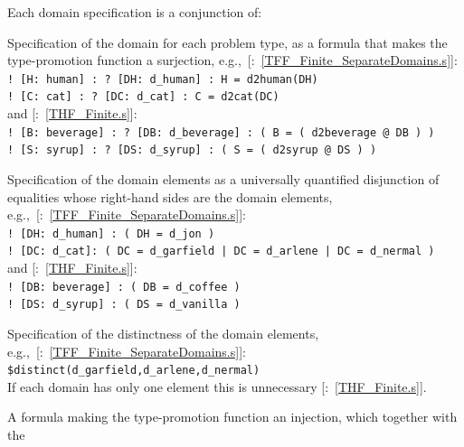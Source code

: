 \documentclass{easychair}
\newcommand{\smalltt}[1]{\small \texttt{#1}}
\newcommand{\example}{{\scriptsize \faFile[regular]}}
\newenvironment{packed_itemize}{
\vspace*{-0.3em}
\begin{itemize}
\setlength{\partopsep}{0pt}
\setlength{\itemsep}{1pt}
\setlength{\parskip}{0pt}
\setlength{\parsep}{0pt}
}{\end{itemize}}
\begin{document}
Each domain specification is a conjunction of:
\begin{packed_itemize}
\item Specification of the domain for each problem type, as a formula that makes the 
      type-promotion function a surjection, 
      e.g.,~[\example{}:~\ref{TFF_Finite_SeparateDomains.s}]:\\
      \hspace*{0.5cm}\smalltt{! [H: human] : ? [DH: d\_human] : H = d2human(DH)}\\
      \hspace*{0.5cm}\smalltt{! [C: cat] : ? [DC: d\_cat] : C = d2cat(DC)}\\
      and [\example{}:~\ref{THF_Finite.s}]:\\
      \hspace*{0.5cm}\smalltt{! [B: beverage] : ? [DB: d\_beverage] : ( B = ( d2beverage @ DB ) )}\\
      \hspace*{0.5cm}\smalltt{! [S: syrup] : ? [DS: d\_syrup] : ( S = ( d2syrup @ DS ) )}
\item Specification of the domain elements as a universally quantified disjunction of equalities 
      whose right-hand sides are the domain elements, 
      e.g.,~[\example{}:~\ref{TFF_Finite_SeparateDomains.s}]:\\
      \hspace*{0.5cm}\smalltt{! [DH: d\_human] : ( DH = d\_jon )}\\
      \hspace*{0.5cm}\smalltt{! [DC: d\_cat]: ( DC = d\_garfield | DC = d\_arlene | DC = d\_nermal )}\\
      and [\example{}:~\ref{THF_Finite.s}]:\\
      \hspace*{0.5cm}\smalltt{! [DB: beverage] : ( DB = d\_coffee )}\\
      \hspace*{0.5cm}\smalltt{! [DS: d\_syrup] : ( DS = d\_vanilla )}
\item Specification of the distinctness of the domain elements, 
      e.g.,~[\example{}:~\ref{TFF_Finite_SeparateDomains.s}]:\\
      \hspace*{0.5cm}\smalltt{\$distinct(d\_garfield,d\_arlene,d\_nermal)}\\
      If each domain has only one element this is unnecessary [\example{}:~\ref{THF_Finite.s}].
\item A formula making the type-promotion function an injection, which together with the 

\end{packed_itemize}
\end{document}

